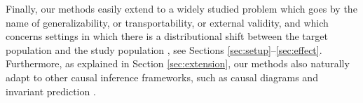 Finally, our methods easily extend to a widely studied problem which
goes by the name of generalizability, or transportability, or external
validity, and which concerns settings in which there is a
distributional shift between the target population and the study
population \citep[e.g.][]{stuart2011use, tipton2014generalizable}, see
Sections \ref{sec:setup}--\ref{sec:effect}. Furthermore, as explained
in Section \ref{sec:extension}, our methods also naturally adapt to
other causal inference frameworks, such as causal diagrams
\citep{pearl1995causal} and invariant prediction
\citep{peters2016causal}.



